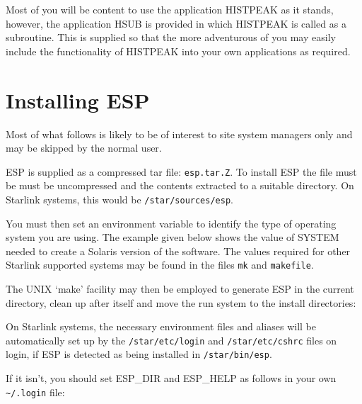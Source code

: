 \documentclass[twoside,11pt]{starlink}
\begin{document}
Most of you will be content to use the application HISTPEAK as it stands,
however, the application HSUB is provided in which HISTPEAK is called as
a subroutine. This is supplied so that the more adventurous of you may
easily include the functionality of HISTPEAK into your own
applications as required.


\section{Installing ESP}
\label{sec:installing}

Most of what follows is likely to be of interest to site system managers only
and may be skipped by the normal user.

ESP is supplied as a compressed tar file: \texttt{esp.tar.Z}. To install ESP
the file must be must be uncompressed and the contents extracted to a
suitable directory.  On Starlink systems, this would be \texttt{/star/sources/esp}.

\begin{terminalv}
\end{terminalv}

You must then set an environment variable to identify the type of
operating system you are using. The example given below shows the value
of SYSTEM needed to create a Solaris version of the software. The values
required for other Starlink supported systems may be found in the files
\texttt{mk} and \texttt{makefile}.

\begin{terminalv}
\end{terminalv}

The UNIX `make' facility may then be employed to generate ESP in the
current directory, clean up after itself and move the run system to the
install directories:

\begin{terminalv}
\end{terminalv}

On Starlink systems, the necessary environment files and aliases will
be automatically set up by the \texttt{/star/etc/login} and \texttt{/star/etc/cshrc}
files on login, if ESP is detected as being installed in \texttt{/star/bin/esp}.

If it isn't, you should set ESP\_DIR and ESP\_HELP as follows in your own
{\verb+ ~/.login+} file:
\end{document}
